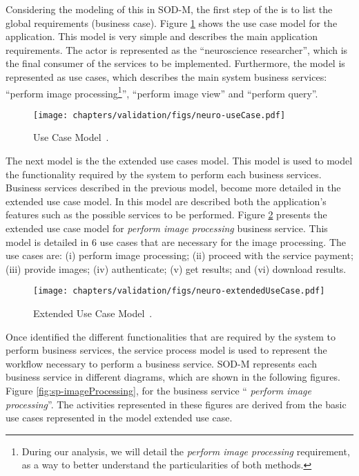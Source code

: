 Considering the modeling of this  in SOD-M, the first step of the is
to list the global requirements (business case). Figure \ref{fig:sodm_usecase}
shows the use case model for the application. This model is very simple and describes the main application requirements. The actor is represented as the ``neuroscience
researcher'', which is the final consumer of the services to be implemented.
Furthermore, the model is represented as use cases, which describes the main
system business services: ``perform image processing\footnote{During our
analysis, we will detail the \textit{perform image processing} requirement, as a
way to better understand the particularities of both methods.}'', ``perform
image view'' and ``perform query''.


	

\begin{figure}[ht!]
\centering
\texttt{[image: chapters/validation/figs/neuro-useCase.pdf]}
\caption{Use Case Model~\cite{valeriaThesis}.}
\label{fig:sodm_usecase}
\end{figure}

The next model is the the extended use cases model. This model is used to model
the functionality required by the system to perform each business services.
Business services described in the previous model, become more detailed in the
extended use case model. In this model are described both the application's
features such as the possible services to be performed. Figure
\ref{fig:sodm_extendedusecase} presents the extended use case model for
\textit{perform image processing} business service. This model is detailed in 6
use cases that are necessary for the image processing. The use cases are: (i)
perform image processing; (ii) proceed with the service payment; (iii) provide
images; (iv) authenticate; (v) get results; and (vi) download results. 

\begin{figure}[ht!] 
\centering
\texttt{[image: chapters/validation/figs/neuro-extendedUseCase.pdf]}
\caption{Extended Use Case Model~\cite{valeriaThesis}.}
\label{fig:sodm_extendedusecase}
\end{figure} 
 
Once identified the different functionalities that are required by the
system to perform business services, the service process model is used to
represent the workflow necessary to perform a business service. SOD-M represents
each business service in different diagrams, which are shown in the following
figures. Figure \ref{fig:sp-imageProcessing}, for the business service ``
\textit{perform image processing}''. The activities represented in these figures
are derived from the basic use cases represented in the model extended use case.
 
